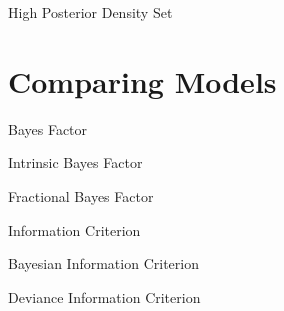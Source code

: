 \documentclass[11pt,a4paper]{article}
\begin{document}
\begin{definition}{High Posterior Density Set}

\end{definition}

\section{Comparing Models}

\begin{definition}{Bayes Factor}

\end{definition}

\begin{definition}{Intrinsic Bayes Factor}

\end{definition}

\begin{definition}{Fractional Bayes Factor}

\end{definition}

\begin{definition}{Information Criterion}

\end{definition}

\begin{definition}{Bayesian Information Criterion}

\end{definition}

\begin{definition}{Deviance Information Criterion}

\end{definition}
\end{document}
